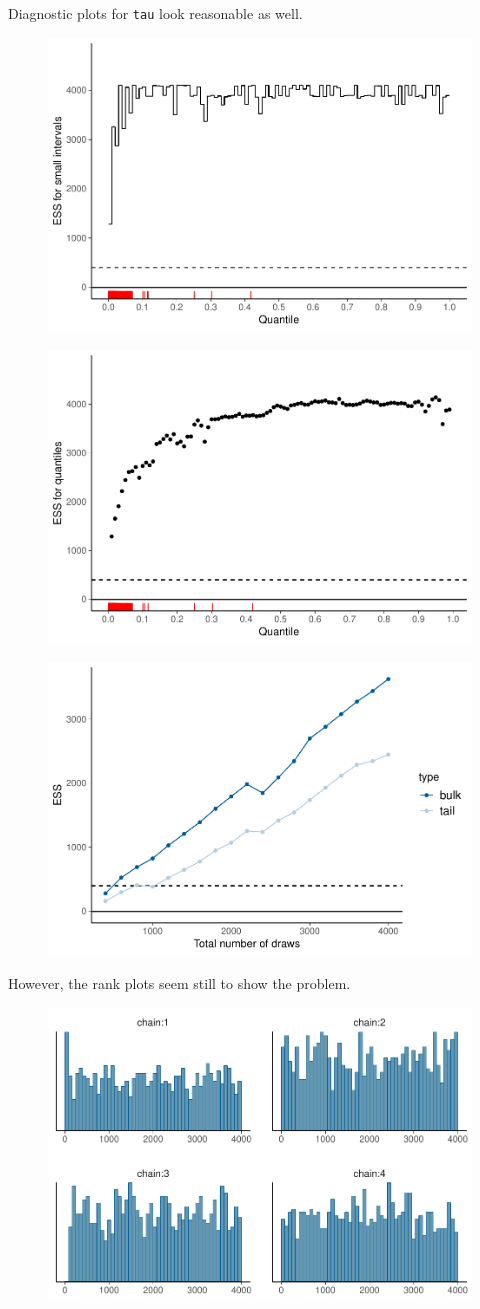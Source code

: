 \documentclass[american,]{article}
\begin{document}
Diagnostic plots for \texttt{tau} look reasonable as well.

\begin{figure}[t]
  \centering
  \includegraphics[width=0.6\linewidth]{graphics/local-ess-fit-cp4-tau-1.pdf}
\end{figure}

\begin{figure}[t]
  \centering
  \includegraphics[width=0.6\linewidth]{graphics/quantile-ess-fit-cp4-tau-1.pdf}
\end{figure}

\begin{figure}[t]
  \centering
  \includegraphics[width=0.6\linewidth]{graphics/change-ess-fit-cp4-tau-1.pdf}
\end{figure}

However, the rank plots seem still to show the problem.

\begin{figure}[t]
  \centering
  \includegraphics[width=0.6\linewidth]{graphics/hist-fit-cp4-tau-1.pdf}
\end{figure}
\end{document}
